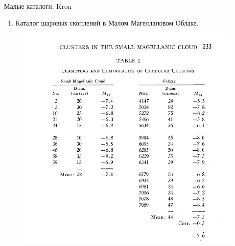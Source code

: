 \documentclass{beamer}
\begin{document}
    \begin{frame}{Малые каталоги. Kron}
        \begin{enumerate}[]
            \item Каталог шаровых скоплений в Малом Магеллановом Облаке.
        \end{enumerate}
        \begin{figure}[h]
            \centering
            \includegraphics[width=0.6\linewidth]{pictures/Kron.jpg}
        \end{figure}
    \end{frame}
\end{document}
